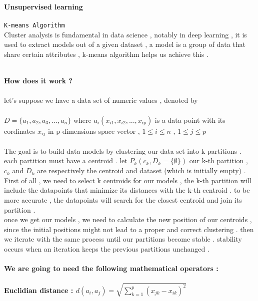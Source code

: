 \documentclass[a4paper]{letter}
\begin{document}
	\centering
 \textbf{\Huge Unsupervised learning} \\ \ \\ \texttt{\huge K-means Algorithm \\} 
 \vspace*{1cm}
\textsf{\Large Cluster analysis is  fundamental in data science , notably in deep learning , it is used to extract models out of a given dataset , a model is a group of data that share  certain attributes , k-means algorithm helps us achieve this .} \\ \ \\
\begin{flushleft}
\textbf{\huge How does it work ?} \\ \ \\ 
\textsf{\Large let's suppose we have a data set of numeric values , denoted by \\ \ \\ $D = \{ a_1 , a_2 , a_3 , ... , a_n \}$ where $a_i(x_{i1},x_{i2},...,x_{ip})$ is a data point with its cordinates $x_{ij}$ in p-dimensions space vector , \hspace*{1cm} $1\leq i \leq n $ , $ 1\leq j \leq p$ } \\ \ \\
\textsf{\Large The goal is to build data models by clustering our data set into k partitions  .  each partition must have a centroid . 
let $P_k(c_k,D_k=\{\emptyset\})$ our k-th partition , $c_k$ and $D_k$ are respectively the centroid and dataset (which is initially empty) . \newline
First of all , we need to select k centroids for our models , the k-th partition will include the datapoints that minimize its distances with the k-th centroid . to be more accurate , the datapoints will search for the closest centroid and join its partition . \\
once we get our models , we need to calculate the new position of our centroids , since the initial positions might not lead to a proper and correct clustering . then we iterate with the same  process  until our partitions become stable . stability occurs when an iteration keeps the previous partitions unchanged .\\ \ \\
  }
\textbf{\Large We are going to need the following mathematical operators : \\ \ \\ Euclidian distance :  $d(a_i,a_j) = \displaystyle \sqrt{\sum_{k=1}^{p}(x_{jk}-x_{ik})^2}$ \\ \ \\
}
\end{flushleft}
\end{document}

